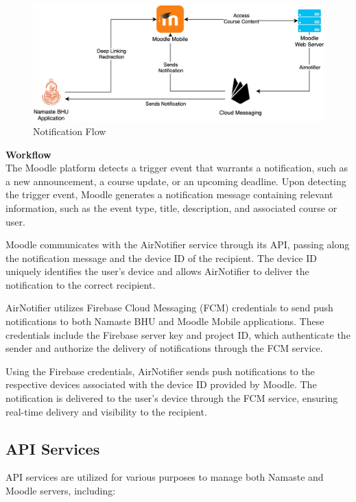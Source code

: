 \begin{figure}
    \centering
    \includegraphics[width=0.75\linewidth]{assets/img/notification-flow.jpg}
    \caption{Notification Flow}
    \label{fig:notification-flow}
\end{figure}

\textbf{Workflow}\\
The Moodle platform detects a trigger event that warrants a notification, such as a new announcement, a course update, or an upcoming deadline.  Upon detecting the trigger event, Moodle generates a notification message containing relevant information, such as the event type, title, description, and associated course or user.

Moodle communicates with the AirNotifier service through its API, passing along the notification message and the device ID of the recipient. The device ID uniquely identifies the user's device and allows AirNotifier to deliver the notification to the correct recipient. 

AirNotifier utilizes Firebase Cloud Messaging (FCM) credentials to send push notifications to both Namaste BHU and Moodle Mobile applications. These credentials include the Firebase server key and project ID, which authenticate the sender and authorize the delivery of notifications through the FCM service.

Using the Firebase credentials, AirNotifier sends push notifications to the respective devices associated with the device ID provided by Moodle. The notification is delivered to the user's device through the FCM service, ensuring real-time delivery and visibility to the recipient.


\subsection{API Services}
API services are utilized for various purposes to manage both Namaste and Moodle servers, including:

